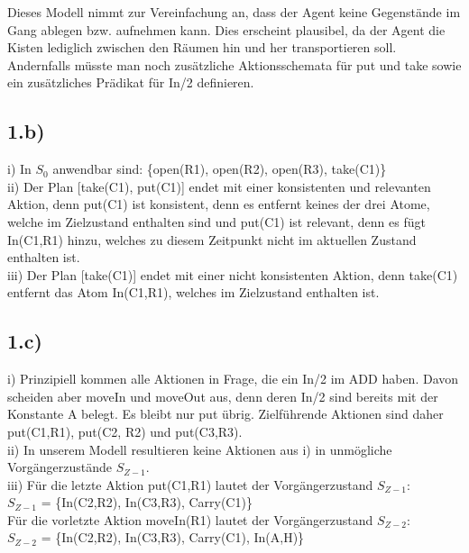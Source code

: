 \documentclass[a4paper]{article}
\begin{document}
Dieses Modell nimmt zur Vereinfachung an, dass der Agent keine Gegenst\"ande im Gang ablegen bzw. aufnehmen kann. Dies erscheint plausibel, da der Agent die Kisten lediglich zwischen den R\"aumen hin und her transportieren soll. Andernfalls m\"usste man noch zus\"atzliche Aktionsschemata f\"ur put und take sowie ein zus\"atzliches Pr\"adikat f\"ur In/2 definieren. 

\subsection*{1.b)}
i) In $S_0$ anwendbar sind: \{open(R1), open(R2), open(R3), take(C1)\}\\

ii) Der Plan [take(C1), put(C1)] endet mit einer konsistenten und relevanten Aktion, denn put(C1) ist konsistent, denn es entfernt keines der drei Atome, welche im Zielzustand enthalten sind und put(C1) ist relevant, denn es f\"ugt In(C1,R1) hinzu, welches zu diesem Zeitpunkt nicht im aktuellen Zustand enthalten ist.\\

iii) Der Plan [take(C1)] endet mit einer nicht konsistenten Aktion, denn take(C1) entfernt das Atom In(C1,R1), welches im Zielzustand enthalten ist.

\subsection*{1.c)}
i) Prinzipiell kommen alle Aktionen in Frage, die ein In/2 im ADD haben. Davon scheiden aber moveIn und moveOut aus, denn deren In/2 sind bereits mit der Konstante A belegt. Es bleibt nur put \"ubrig. Zielf\"uhrende Aktionen sind daher put(C1,R1), put(C2, R2) und put(C3,R3).\\

ii) In unserem Modell resultieren keine Aktionen aus i) in unm\"ogliche Vorg\"angerzust\"ande $S_{Z-1}$.\\

iii) F\"ur die letzte Aktion put(C1,R1) lautet der Vorg\"angerzustand $S_{Z-1}$:\\

$S_{Z-1}$ = \{In(C2,R2), In(C3,R3), Carry(C1)\}\\

F\"ur die vorletzte Aktion moveIn(R1) lautet der Vorg\"angerzustand $S_{Z-2}$:\\

$S_{Z-2}$ = \{In(C2,R2), In(C3,R3), Carry(C1), In(A,H)\}\\
\end{document}
